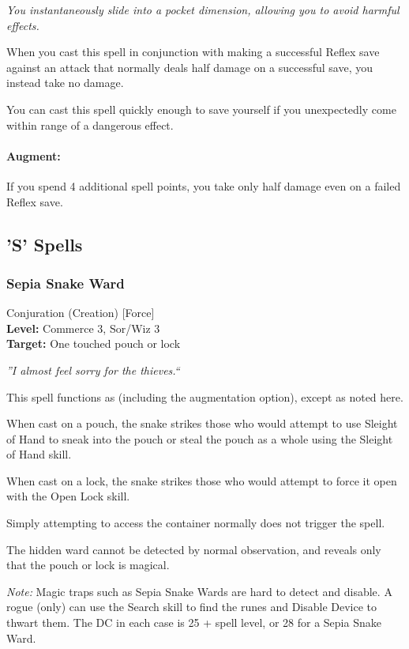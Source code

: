 \emph{You instantaneously slide into a pocket dimension, allowing you to avoid harmful effects.}

When you cast this spell in conjunction with making a successful Reflex save against an attack that normally deals half damage on a successful save, you instead take no damage.

You can cast this spell quickly enough to save yourself if you unexpectedly come within range of a dangerous effect.

\paragraph{Augment:} If you spend 4 additional spell points, you take only half damage even on a failed Reflex save.

\subsection{'S' Spells}

\subsubsection{Sepia Snake Ward}
\label{Spell:SepiaSnakeWard}
Conjuration (Creation) [Force]
\\ \textbf{Level:} Commerce 3, Sor/Wiz 3
\\ \textbf{Target:} One touched pouch or lock

\emph{''I almost feel sorry for the thieves.``}

This spell functions as  (including the augmentation option), except as noted here.

When cast on a pouch, the snake strikes those who would attempt to use Sleight of Hand to sneak into the pouch or steal the pouch as a whole using the Sleight of Hand skill.

When cast on a lock, the snake strikes those who would attempt to force it open with the Open Lock skill.

Simply attempting to access the container normally does not trigger the spell.

The hidden ward cannot be detected by normal observation, and  reveals only that the pouch or lock is magical.

\emph{Note:} Magic traps such as Sepia Snake Wards are hard to detect and disable. 
A rogue (only) can use the Search skill to find the runes and Disable Device to thwart them. 
The DC in each case is 25 + spell level, or 28 for a Sepia Snake Ward.

